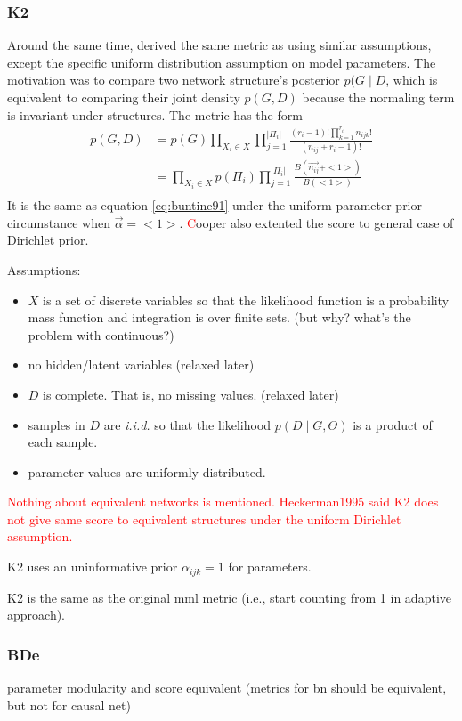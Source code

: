 \subsubsection{K2}
Around the same time, \cite{cooper1992Bayesian} derived the same metric as \cite{buntine1991theory} using similar assumptions, except the specific uniform distribution assumption on model parameters. The motivation was to compare two network structure's posterior $p(G \mid D$, which is equivalent to comparing their joint density $p(G, D)$ because the normaling term is invariant under structures. The metric has the form   
\begin{align}
\label{eq:k2}
p(G, D) &= p(G) \prod_{X_i \in X} \prod_{j=1}^{|\Pi_i|} \frac{(r_i-1)! \prod_{k=1}^{r_i} n_{ijk}!}{(n_{ij}+r_i-1)!} \nonumber \\
&= \prod_{X_i \in X} p(\Pi_i) \prod_{j=1}^{|\Pi_i|} \frac{B(\vec{n_{ij}} + <1>)}{B(<1>)} \\
\end{align}
It is the same as equation \ref{eq:buntine91} under the uniform parameter prior circumstance when $\vec{\alpha} = <1>$. \textcolor{red} Cooper also extented the score to general case of Dirichlet prior. 

Assumptions:
\begin{itemize}
\item $X$ is a set of discrete variables so that the likelihood function is a probability mass function and integration is over finite sets. (but why? what's the problem with continuous?) 
\item no hidden/latent variables (relaxed later) 
\item $D$ is complete. That is, no missing values. (relaxed later) 
\item samples in $D$ are \textit{i.i.d.} so that the likelihood $p(D \mid G, \Theta)$ is a product of each sample. 
\item parameter values are uniformly distributed. 
\end{itemize}

\textcolor{red}{Nothing about equivalent networks is mentioned. Heckerman1995 said K2 does not give same score to equivalent structures under the uniform Dirichlet assumption.} 

K2 uses an uninformative prior $\alpha_{ijk}=1$ for parameters. 

K2 is the same as the original mml metric (i.e., start counting from 1 in adaptive approach). 


\subsubsection{BDe}
parameter modularity and score equivalent (metrics for bn should be equivalent, but not for causal net)

